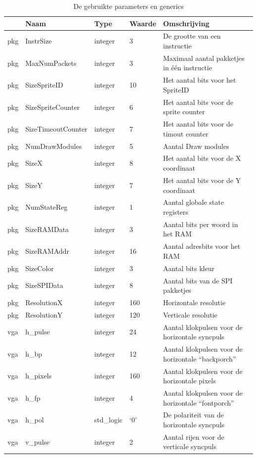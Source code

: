 \documentclass{scrartcl} %
\begin{document}
\begin{table}[H]
\centering
\caption{De gebruikte parameters en generics}
\label{tab:spec-params}
\begin{tabular}{l l l l l}
	\hline\hline
 	 & Naam & Type & Waarde & Omschrijving\\
 	\hline
	pkg & InstrSize & integer & 3 & De grootte van een instructie\\ 
	pkg & MaxNumPackets & integer & 3 & Maximaal aantal pakketjes in één instructie\\ 
	pkg & SizeSpriteID & integer & 10 & Het aantal bits voor het SpriteID \\
	pkg & SizeSpriteCounter & integer & 6 & Het aantal bits voor de sprite counter\\
	pkg & SizeTimeoutCounter & integer & 7 & Het aantal bits voor de timout counter\\
	pkg & NumDrawModules & integer & 5 & Aantal Draw modules\\ 
	pkg & SizeX & integer & 8 & Het aantal bits voor de X coordinaat\\
	pkg & SizeY & integer & 7 & Het aantal bits voor de Y coordinaat\\
	pkg & NumStateReg & integer & 1 & Aantal globale state registers\\
	pkg & SizeRAMData & integer & 3 & Aantal bits per woord in het RAM\\
	pkg & SizeRAMAddr & integer & 16 & Aantal adresbits voor het RAM\\
	pkg & SizeColor & integer & 3 & Aantal bits kleur\\
	pkg & SizeSPIData & integer & 8 & Aantal bits van de SPI pakketjes\\
	pkg & ResolutionX & integer & 160 & Horizontale resolutie \\
	pkg & ResolutionY & integer & 120 & Verticale resolutie \\
	vga & h\_pulse & integer & 24 & Aantal klokpulsen voor de horizontale syncpuls\\ 
	vga & h\_bp & integer & 12 & Aantal klokpulsen voor de horizontale “backporch” \\ 
	vga & h\_pixels & integer & 160 & Aantal klokpulsen voor de horizontale pixels \\ 
	vga & h\_fp & integer & 4 & Aantal klokpulsen voor de horizontale “fontporch” \\ 
	vga & h\_pol & std\_logic & ‘0’ & De polariteit van de horizontale syncpuls\\ 
	vga & v\_pulse & integer & 2 & Aantal rijen voor de verticale syncpuls\\ 

\end{tabular}
\end{table}
\end{document}
